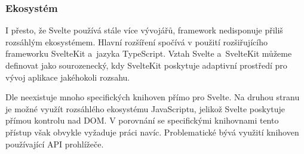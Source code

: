 \subsubsection{Ekosystém}

I přesto, že Svelte používá stále více vývojářů, framework nedisponuje přiliš rozsáhlým ekosystémem. Hlavní rozšíření spočívá v použití rozšiřujícího frameworku SvelteKit a~jazyka TypeScript. 
Vztah Svelte a~SvelteKit můžeme definovat jako sourozenecký, kdy SvelteKit poskytuje adaptivní prostředí pro vývoj aplikace jakéhokoli rozsahu.

Dle \cite{sveltedailydev} neexistuje mnoho specifických knihoven přímo pro Svelte. 
Na druhou stranu je možné využít rozsáhlého ekosystému JavaScriptu, jelikož Svelte poskytuje přímou kontrolu nad DOM. 
V porovnání se specifickými knihovnami tento přístup však obvykle vyžaduje práci navíc. 
Problematické bývá využití knihoven používající API prohlížeče.\cite{svelteheyreliable,sveltedailydev,sveltejslibs}
